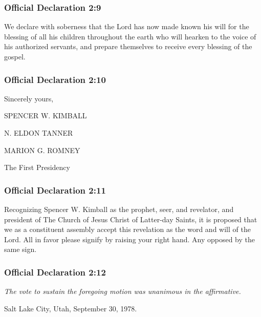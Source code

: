 	\subsubsection{Official Declaration 2:9} %
		\label{OD2-9}
		
		We declare with soberness that the Lord has now made known his will for the blessing of all his children throughout the earth who will hearken to the voice of his authorized servants, and prepare themselves to receive every blessing of the gospel.
		
	\subsubsection{Official Declaration 2:10} %
		\label{OD2-10}
		
		Sincerely yours,

		SPENCER W. KIMBALL
			
		N. ELDON TANNER
		
		MARION G. ROMNEY

		The First Presidency 
		
	\subsubsection{Official Declaration 2:11} %
		\label{OD2-11}
		
		Recognizing Spencer W. Kimball as the prophet, seer, and revelator, and president of The Church of Jesus Christ of Latter-day Saints, it is proposed that we as a constituent assembly accept this revelation as the word and will of the Lord.  All in favor please signify by raising your right hand.  Any opposed by the same sign.
		
	\subsubsection{Official Declaration 2:12} %
		\label{OD2-12}
		
		\textit{The vote to sustain the foregoing motion was unanimous in the affirmative.}

		Salt Lake City, Utah, September 30, 1978.